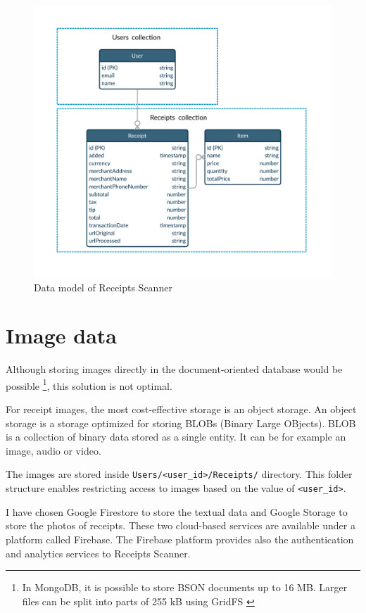 \documentclass[
  digital, %
  table,   %
  oneside, %
  lof,     %
  lot,     %
]{fithesis3}
\begin{document}
    \begin{figure}
        \begin{center}
            \includegraphics[width=\textwidth]{figures/other/data_model_firestore}
        \end{center}
        \caption{Data model of Receipts Scanner}
        \label{fig:data_model_firestore}
    \end{figure}

\section{Image data}
Although storing images directly in the document-oriented database would be possible \footnote{In MongoDB, it is possible to store BSON documents up to 16 MB. Larger files can be split into parts of 255 kB using GridFS \cite{GridFS}}, this solution is not optimal.

For receipt images, the most cost-effective storage is an object storage. An object storage is a storage optimized for storing BLOBs (Binary Large OBjects). BLOB is a collection of binary data stored as a single entity. It can be for example an image, audio or video. 

The images are stored inside \texttt{Users/<user\_id>/Receipts/} directory. This folder structure enables restricting access to images based on the value of \texttt{<user\_id>}.

I have chosen Google Firestore to store the textual data and Google Storage to store the photos of receipts. These two cloud-based services are available under a platform called Firebase. The Firebase platform provides also the authentication and analytics services to Receipts Scanner.
\end{document}

